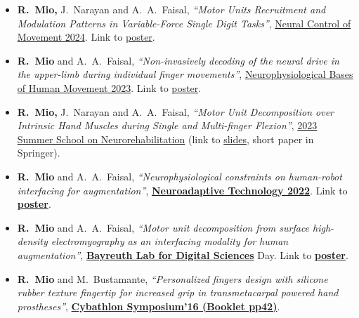 \documentclass[a4paper,10pt]{article}
\begin{document}
\begin{itemize}
  \item \textbf{R.\ Mio,} J.\ Narayan and A.\ A.\ Faisal,
        \textit{``Motor Units Recruitment and Modulation Patterns in Variable-Force Single Digit
        Tasks''},
        \href{https://ncm-society.org/}{Neural Control of Movement 2024}.
        Link to \href{https://drive.google.com/file/d/17kBlPfE_kr3WV9e0rjOBWC9FSO4G9oKw/view}{poster}.

  \item \textbf{R.\ Mio} and A.\ A.\ Faisal,
        \textit{``Non-invasively decoding of the neural drive in the upper-limb during individual
        finger movements''},
        \href{https://www.physoc.org/events/neurophysiological-bases-of-human-movement/}{Neurophysiological
        Bases of Human Movement 2023}.
        Link to \href{https://drive.google.com/file/d/1-DpTwF4H6sdqBJrMI3x_ZBgHl-5VQmVk/view}{poster}.

  \item \textbf{R.\ Mio,} J.\ Narayan and A.\ A.\ Faisal,
        \textit{``Motor Unit Decomposition over Intrinsic Hand Muscles during Single and
        Multi-finger Flexion''},
        \href{https://2023.summerschoolneurorehabilitation.org}{2023 Summer School on
        Neurorehabilitation}
        (link to \href{https://drive.google.com/file/d/1-HyJaLUFHGsnG2T6gvZWTOqyVgjK2bR5/view}{slides},
        short paper in Springer).

  \item \textbf{R.\ Mio} and A.\ A.\ Faisal,
        \textit{``Neurophysiological constraints on human-robot interfacing for augmentation''},
        \href{https://neuroadaptive.org/conference/2022/}{\textbf{Neuroadaptive Technology 2022}}.
        Link to \href{https://drive.google.com/file/d/1CpjFdZZpJDgakxyRok4HfbizW350qU1z/view}{\textbf{poster}}.

  \item \textbf{R.\ Mio} and A.\ A.\ Faisal,
        \textit{``Motor unit decomposition from surface high-density electromyography as an
        interfacing modality for human augmentation''},
        \href{https://www.baylds.uni-bayreuth.de/de/index.html}{\textbf{Bayreuth Lab for Digital
        Sciences}} Day.
        Link to \href{https://drive.google.com/file/d/1CoQB-ViriyMpCrMtY-vz5LEwlsmC-0Zd/view}{\textbf{poster}}.

  \item \textbf{R.\ Mio} and M.\ Bustamante,
        \textit{``Personalized fingers design with silicone rubber texture fingertip for increased
        grip in transmetacarpal powered hand prostheses''},
        \href{https://ethz.ch/content/dam/ethz/special-interest/conference-websites-dam/cybathlon-symp-dam/documents/Cybathlon\%20Symposium\%20Booklet.pdf}{\textbf{Cybathlon Symposium'16 (Booklet pp42)}}.
\end{itemize}
\end{document}
